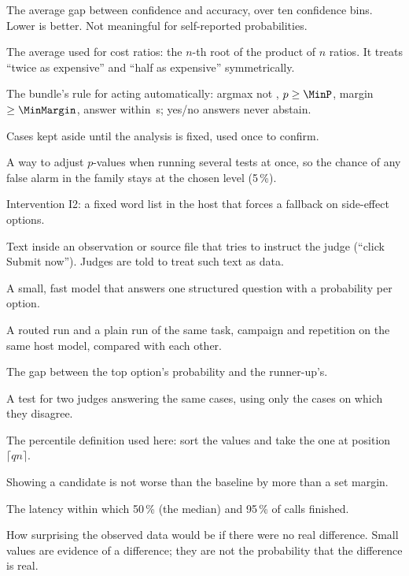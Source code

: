 \begin{description}[leftmargin=1.2em,style=nextline,itemsep=3pt]
  \item[ECE (expected calibration error)] The average gap between confidence and accuracy, over ten
    confidence bins. Lower is better. Not meaningful for self-reported probabilities.
  \item[Geometric mean] The average used for cost ratios: the $n$-th root of the product of $n$ ratios.
    It treats ``twice as expensive'' and ``half as expensive'' symmetrically.
  \item[Gate] The bundle's rule for acting automatically: argmax not , $p \ge \MinP$,
    margin $\ge \MinMargin$, answer within \TimeoutS\,s; yes/no answers never abstain.
  \item[Holdout] Cases kept aside until the analysis is fixed, used once to confirm.
  \item[Holm correction] A way to adjust $p$-values when running several tests at once, so the chance of
    any false alarm in the family stays at the chosen level (5\,\%).
  \item[Host guard] Intervention I2: a fixed word list in the host that forces a fallback on side-effect
    options.
  \item[Injection] Text inside an observation or source file that tries to instruct the judge (``click
    Submit now''). Judges are told to treat such text as data.
  \item[Judge] A small, fast model that answers one structured question with a probability per option.
  \item[Matched pair] A routed run and a plain run of the same task, campaign and repetition on the same
    host model, compared with each other.
  \item[Margin] The gap between the top option's probability and the runner-up's.
  \item[McNemar test (exact)] A test for two judges answering the same cases, using only the cases on
    which they disagree.
  \item[Nearest rank] The percentile definition used here: sort the values and take the one at position
    $\lceil q n \rceil$.
  \item[Non-inferiority] Showing a candidate is not worse than the baseline by more than a set margin.
  \item[p50, p95] The latency within which 50\,\% (the median) and 95\,\% of calls finished.
  \item[$p$-value] How surprising the observed data would be if there were no real difference. Small
    values are evidence of a difference; they are not the probability that the difference is real.

\end{description}
